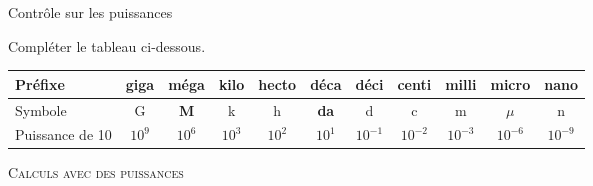 \documentclass[10pt,addpoints]{exam}
\begin{document}
\begin{center}
    \Huge{Contrôle sur les puissances}
\end{center}

\newcommand{\sol}[1]
{%
\ifprintanswers \textbf{#1} \fi%
}

\unframedsolutions

\begin{questions}

\question[2] Compléter le tableau ci-dessous.

\begin{table}[h!]
    \centering
    \begin{tabular}{|l|c|c|c|c|c|c|c|c|c|c|}\hline
    Préfixe & giga & méga & kilo & hecto & déca & déci & centi & milli & \sol{micro} & nano  \\\hline
    Symbole & G & \sol{M} & k & h & \sol{da} & d & c & m & $\mu$ & n \\\hline
    Puissance de 10\phantom{$1^{2^3}$} & $10^9$ & $10^6$ & $10^3$ & $10^2$ & $10^1$ & $10^{-1}$ & \sol{$10^{-2}$} & $10^{-3}$ & $10^{-6}$ & $10^{-9}$ \\\hline
    \end{tabular}
\end{table}

\question[4] \textsc{Calculs avec des puissances}


\end{questions}
\end{document}
